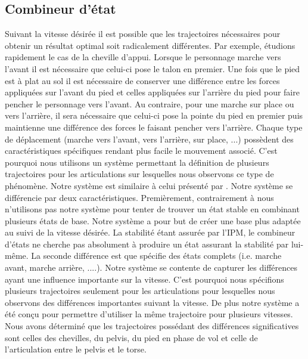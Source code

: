 \documentclass[runningheads,a4paper]{llncs}
\begin{document}
\subsection{Combineur d'état}
\label{sec:multi_state}
%
Suivant la vitesse désirée il est possible que les trajectoires nécessaires pour obtenir un résultat optimal soit radicalement différentes. Par exemple, étudions rapidement le cas de la cheville d'appui. Lorsque le personnage marche vers l'avant il est nécessaire que celui-ci pose le talon en premier. Une fois que le pied est à plat au sol il est nécessaire de conserver une différence entre les forces appliquées sur l'avant du pied et celles appliquées sur l'arrière du pied pour faire pencher le personnage vers l'avant. Au contraire, pour une marche sur place ou vers l'arrière, il sera nécessaire que celui-ci pose la pointe du pied en premier puis maintienne une différence des forces le faisant pencher vers l'arrière. Chaque type de déplacement (marche vers l'avant, vers l'arrière, sur place, ...) possèdent des caractéristiques spécifiques rendant plus facile le mouvement associé. C'est pourquoi nous utilisons un système permettant la définition de plusieurs trajectoires pour les articulations sur lesquelles nous observons ce type de phénomène. Notre système est similaire à celui présenté par \cite{coros2009robust}. Notre système se différencie par deux caractéristiques. Premièrement, contrairement à \cite{coros2009robust} nous n'utilisons pas notre système pour tenter de trouver un état stable en combinant plusieurs états de base. Notre système a pour but de créer une base plus adaptée au suivi de la vitesse désirée. La stabilité étant assurée par l'IPM, le combineur d'états ne cherche pas absolument à produire un état assurant la stabilité par lui-même. La seconde différence est que \cite{coros2009robust} spécifie des états complets (i.e. marche avant, marche arrière, ....). Notre système se contente de capturer les différences ayant une influence importante sur la vitesse. C'est pourquoi nous spécifions plusieurs trajectoires seulement pour les articulations pour lesquelles nous observons des différences importantes suivant la vitesse. De plus notre système a été conçu pour permettre d'utiliser la même trajectoire pour plusieurs vitesses. Nous avons déterminé que les trajectoires possédant des différences significatives sont celles des chevilles, du pelvis, du pied en phase de vol et celle de l'articulation entre le pelvis et le torse. 
\end{document}
